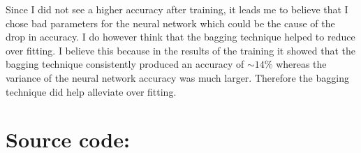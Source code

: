 \begin{enumerate}
\begin{enumerate}
				Since I did not see a higher accuracy after training, it leads me to believe that I chose bad parameters for the neural network which could be the cause of the drop in accuracy.  I do however think that the bagging technique helped to reduce over fitting.  I believe this because in the results of the training it showed that the bagging technique consistently produced an accuracy of  \( \sim14\% \) whereas the variance of the neural network accuracy was much larger.  Therefore the bagging technique did help alleviate over fitting.			
			
		\end{enumerate}
			
\end{enumerate}

\section{Source code:}

